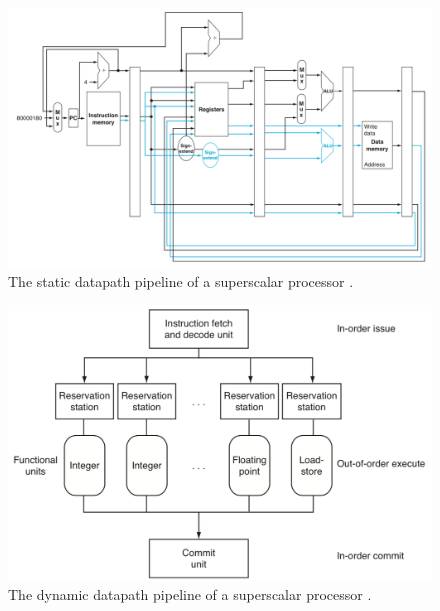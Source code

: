 \begin{figure}[h]
\centering 
\includegraphics[width=6in]{./pics/superscalar-static-pipeline}
\caption{The static datapath pipeline of a superscalar processor \cite{Patterson2012}.}
\label{fig:superscalarstaticpipeline}
\end{figure}

\begin{figure}[h]
\centering 
\includegraphics[width=6in]{./pics/superscalar-dynamic-pipeline}
\caption{The dynamic datapath pipeline of a superscalar processor \cite{Patterson2012}.}
\label{fig:superscalardynamicpipeline}
\end{figure}




